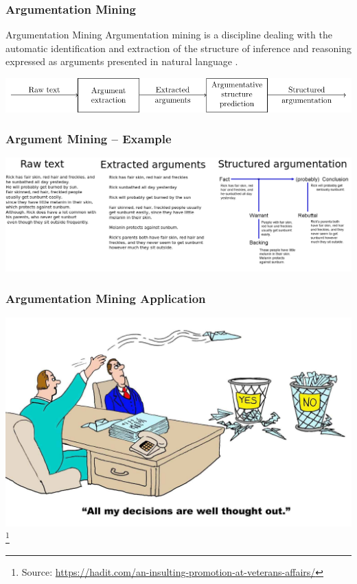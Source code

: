 \documentclass{beamer}
\begin{document}

\begin{frame}

\frametitle{Argumentation Mining}
\begin{block}{Argumentation Mining}
Argumentation mining is a discipline dealing with the automatic identification and extraction
of the structure of inference and reasoning expressed as arguments presented in natural language
\cite{lawrence2019argument}.
\end{block}

\vspace{1cm}
\includegraphics[scale=0.7]{../area_description_pipeline-figure0.pdf}
\end{frame}

\begin{frame}
	\frametitle{Argument Mining -- Example}
	\includegraphics[scale=0.3]{argstruc.png}
\end{frame}


\begin{frame}
\frametitle{Argumentation Mining Application}

\includegraphics[scale=0.2]{informed_decision.jpeg}
\footnote{
\tiny{Source: \url{https://hadit.com/an-insulting-promotion-at-veterans-affairs/}}}

\end{frame}
\end{document}
